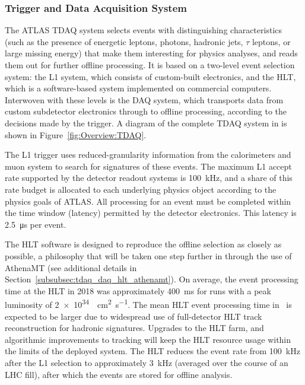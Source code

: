 \documentclass[cernpreprint, atlasdraft=false, UKenglish,british,orcidlogo, texmf, orcidlogo]{atlasdoc}
\begin{document}
\subsubsection{Trigger and Data Acquisition System}
\label{subsec:OverviewTDAQ}
 
The ATLAS \gls{TDAQ} system selects events with distinguishing characteristics (such as the presence of energetic leptons, photons, hadronic jets, $\tau$ leptons, or large missing energy) that make them interesting for physics analyses, and reads them out for further offline processing. It is based on a two-level event selection system: the \gls{L1} system,
which consists of custom-built electronics, and the \gls{HLT}, which is a software-based system implemented on commercial computers. Interwoven with these levels is the \gls{DAQ} system, which transports data from custom subdetector electronics through to offline processing, according to the decisions made by the trigger. A diagram of the complete \gls{TDAQ} system in \RunThr is shown in Figure~\ref{fig:Overview:TDAQ}.
 
The \gls{L1} trigger uses reduced-granularity information from the calorimeters and muon system to search for signatures of these events.
The maximum \gls{L1} accept rate supported by the detector readout systems is \SI{100}{\kHz}, and a share of this rate budget is allocated to each underlying physics object according to the physics goals of ATLAS. All processing for an event must be completed within the time window (latency) permitted by the detector electronics. This latency is \SI{2.5}{\micro\s} per event.
 
The \gls{HLT} software is designed to reproduce the offline selection as closely as possible, a philosophy that will be taken one step further in \RunThr through the use of AthenaMT (see additional details in Section~\ref{subsubsec:tdaq_daq_hlt_athenamt}). On average, the event processing time at the \gls{HLT} in 2018 was approximately \SI{400}{\ms} for runs with a peak luminosity of \SI{2e34}{\per\cm\squared\per\s}. The mean \gls{HLT} event processing time in \RunThr\ is expected to be larger due to widespread use of full-detector \gls{HLT} track reconstruction for hadronic signatures. Upgrades to the \gls{HLT} farm, and algorithmic improvements to tracking will keep the \gls{HLT} resource usage within the limits of the deployed system. The \gls{HLT} reduces the event rate from \SI{100}{\kHz} after the \gls{L1} selection to approximately \SI{3}{\kHz} (averaged over the course of an \gls{LHC} fill), after which the events are stored for offline analysis.
 
\end{document}
